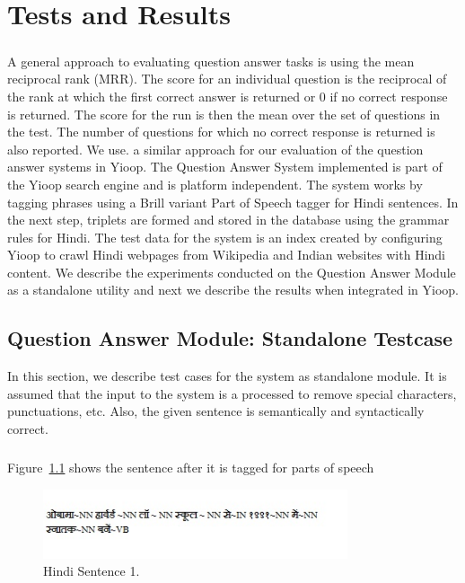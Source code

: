 \chapter{Tests and Results}

\paragraph{}
A general approach to evaluating question answer tasks is using the mean reciprocal rank (MRR). The score for an individual question is the reciprocal of the rank at which the first correct answer is returned or 0 if no correct response is returned. The score for the run is then the mean over the set of questions in the test. The number of questions for which no correct response is returned is also reported. We use. a similar approach for our evaluation of the question answer systems in Yioop. The Question Answer System implemented is part of the Yioop search engine and is platform independent. The system works by tagging phrases using a Brill variant Part of Speech tagger for Hindi sentences. In the next step, triplets are formed and stored in the database using the grammar rules for Hindi. The test data for the system is an index created by configuring Yioop to crawl Hindi webpages from Wikipedia and Indian websites with Hindi content. We describe the experiments conducted on the Question Answer Module as a standalone utility and next we describe the results when integrated in Yioop.

\section {Question Answer Module: Standalone Testcase}
In this section, we describe test cases for the system as standalone module. It is assumed that the input to the system is a processed to remove special characters, punctuations, etc. Also, the given sentence is semantically and syntactically correct.

\paragraph{}
Figure~\ref{fig:sentence_testcase1} shows the sentence after it is tagged for parts of speech

\begin{figure}[htb]
\centering
\includegraphics[width=0.8\textwidth]{images/sentence_testcase1.jpg}
\caption{Hindi Sentence 1.} 
\label{fig:sentence_testcase1}
\end{figure}

